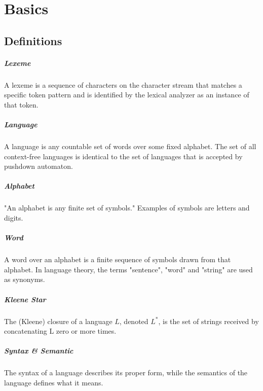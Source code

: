 \chapter{Basics}
\label{cha:basics}
\section{Definitions}

\paragraph{Lexeme }
A lexeme is a sequence of characters on the character stream that matches a specific token pattern and is identified by the lexical analyzer as an instance of that token. \cite{DragonBook}

\paragraph{Language} 
A language is any countable set of words over some fixed alphabet. The set of all context-free languages is identical to the set of languages that is accepted by pushdown automaton. \cite{DragonBook}

\paragraph{Alphabet}
"An alphabet is any finite set of symbols." Examples of symbols are letters and digits. \cite{DragonBook}

\paragraph{Word} 
A word over an alphabet is a finite sequence of symbols drawn from that alphabet. In language theory, the terms "sentence", "word" and "string" are used as synonyms. \cite{DragonBook}

\paragraph{Kleene Star} 
The (Kleene) closure of a language $L$, denoted $L^*$, is the set of strings received by concatenating L zero or more times. \cite{DragonBook}


\paragraph{Syntax \& Semantic}  
The syntax of a language describes its proper form, while the semantics of the language defines what it means. \cite{DragonBook}


